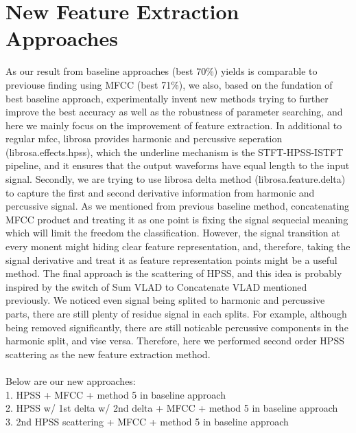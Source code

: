 \documentclass[final]{siamltexmm}
\begin{document}
\section{New Feature Extraction Approaches}
As our result from baseline approaches (best 70\%) yields is comparable to previouse finding using MFCC (best 71\%), we also, based on the fundation of best baseline approach, experimentally invent new methods trying to further improve the best accuracy as well as the robustness of parameter searching, and here we mainly focus on the improvement of feature extraction. In additional to regular mfcc, librosa provides harmonic and percussive seperation (librosa.effects.hpss), which the underline mechanism is the STFT-HPSS-ISTFT pipeline, and it ensures that the output waveforms have equal length to the input signal. Secondly, we are trying to use librosa delta method (librosa.feature.delta) to capture the first and second derivative information from harmonic and percussive signal. As we mentioned from previous baseline method, concatenating MFCC product and treating it as one point is fixing the signal sequecial meaning which will limit the freedom the classification. However, the signal transition at every monent might hiding clear feature representation, and, therefore, taking the signal derivative and treat it as feature representation points might be a useful method. The final approach is the scattering of HPSS, and this idea is probably inspired by the switch of Sum VLAD to Concatenate VLAD mentioned previously. We noticed even signal being splited to harmonic and percussive parts, there are still plenty of residue signal in each splits. For example, although being removed significantly, there are still noticable percussive components in the harmonic split, and vise versa. Therefore, here we performed second order HPSS scattering as the new feature extraction method.
\\\\Below are our new approaches:
\\ 1. HPSS + MFCC + method 5 in baseline approach
\\ 2. HPSS w/ 1st delta w/ 2nd delta + MFCC + method 5 in baseline approach
\\ 3. 2nd HPSS scattering + MFCC + method 5 in baseline approach
\\
\end{document}
